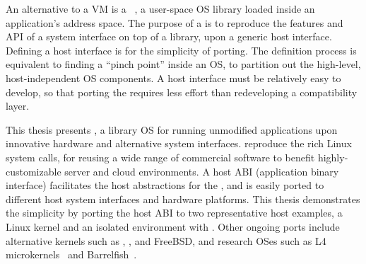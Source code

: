 An alternative to a VM is
a {\bf \libos{}}
~\cite{porter11drawbridge,engler95exokernel,libra,unikernels},
a user-space OS library loaded
inside an application's address space.
The purpose of a \libos{} is to
reproduce the features and API of a system interface on top of a library,
upon a generic host interface.
Defining a host interface is for the simplicity of porting.
The definition process
is equivalent to
finding a ``pinch point'' inside an OS,
to partition out the high-level, host-independent OS components.
A host interface must be relatively easy to develop,
so that porting the \libos{}
requires less effort than redeveloping
a compatibility layer.


This thesis presents
{\bf \graphene{}},
a library OS for running unmodified applications upon innovative hardware and alternative system interfaces.
\graphene{} reproduce the rich Linux system calls,
for reusing a wide range of commercial software
to benefit highly-customizable server and cloud environments.
A host ABI (application binary interface)
facilitates the
host abstractions for the \libos{},
and is easily ported to different host system interfaces
and hardware platforms. 
This thesis demonstrates the simplicity
by porting the host ABI
to two representative host examples, a Linux kernel and an isolated environment with \sgx{}.
Other ongoing ports
include alternative kernels such as \win{}, \osx{}, and FreeBSD, and research OSes such as L4 microkernels~\cite{l4family} and Barrelfish~\cite{baumann09barrelfish}.



